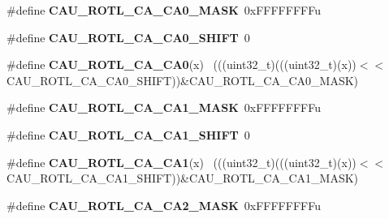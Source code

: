 \begin{DoxyCompactItemize}
\item 
\hypertarget{group___c_a_u___register___masks_ga2b86bab9480c6bf6115dad260ab161a3}{}\#define {\bfseries C\+A\+U\+\_\+\+R\+O\+T\+L\+\_\+\+C\+A\+\_\+\+C\+A0\+\_\+\+M\+A\+S\+K}~0x\+F\+F\+F\+F\+F\+F\+F\+Fu\label{group___c_a_u___register___masks_ga2b86bab9480c6bf6115dad260ab161a3}

\item 
\hypertarget{group___c_a_u___register___masks_ga3181be32a342d2194fc201a642c18878}{}\#define {\bfseries C\+A\+U\+\_\+\+R\+O\+T\+L\+\_\+\+C\+A\+\_\+\+C\+A0\+\_\+\+S\+H\+I\+F\+T}~0\label{group___c_a_u___register___masks_ga3181be32a342d2194fc201a642c18878}

\item 
\hypertarget{group___c_a_u___register___masks_ga767139321c3d6a1db9f2c135908d4c5a}{}\#define {\bfseries C\+A\+U\+\_\+\+R\+O\+T\+L\+\_\+\+C\+A\+\_\+\+C\+A0}(x)                                          ~(((uint32\+\_\+t)(((uint32\+\_\+t)(x))$<$$<$C\+A\+U\+\_\+\+R\+O\+T\+L\+\_\+\+C\+A\+\_\+\+C\+A0\+\_\+\+S\+H\+I\+F\+T))\&C\+A\+U\+\_\+\+R\+O\+T\+L\+\_\+\+C\+A\+\_\+\+C\+A0\+\_\+\+M\+A\+S\+K)\label{group___c_a_u___register___masks_ga767139321c3d6a1db9f2c135908d4c5a}

\item 
\hypertarget{group___c_a_u___register___masks_gabfb4747ca51ec2bf523adf1d27b3a55c}{}\#define {\bfseries C\+A\+U\+\_\+\+R\+O\+T\+L\+\_\+\+C\+A\+\_\+\+C\+A1\+\_\+\+M\+A\+S\+K}~0x\+F\+F\+F\+F\+F\+F\+F\+Fu\label{group___c_a_u___register___masks_gabfb4747ca51ec2bf523adf1d27b3a55c}

\item 
\hypertarget{group___c_a_u___register___masks_ga7a9ebabc5cddc8cb1d94f2b371b614d2}{}\#define {\bfseries C\+A\+U\+\_\+\+R\+O\+T\+L\+\_\+\+C\+A\+\_\+\+C\+A1\+\_\+\+S\+H\+I\+F\+T}~0\label{group___c_a_u___register___masks_ga7a9ebabc5cddc8cb1d94f2b371b614d2}

\item 
\hypertarget{group___c_a_u___register___masks_ga129821ccbdd5b4576029a7b9c0bfeccd}{}\#define {\bfseries C\+A\+U\+\_\+\+R\+O\+T\+L\+\_\+\+C\+A\+\_\+\+C\+A1}(x)                                          ~(((uint32\+\_\+t)(((uint32\+\_\+t)(x))$<$$<$C\+A\+U\+\_\+\+R\+O\+T\+L\+\_\+\+C\+A\+\_\+\+C\+A1\+\_\+\+S\+H\+I\+F\+T))\&C\+A\+U\+\_\+\+R\+O\+T\+L\+\_\+\+C\+A\+\_\+\+C\+A1\+\_\+\+M\+A\+S\+K)\label{group___c_a_u___register___masks_ga129821ccbdd5b4576029a7b9c0bfeccd}

\item 
\hypertarget{group___c_a_u___register___masks_ga747bae472035b772b9099ece284b7520}{}\#define {\bfseries C\+A\+U\+\_\+\+R\+O\+T\+L\+\_\+\+C\+A\+\_\+\+C\+A2\+\_\+\+M\+A\+S\+K}~0x\+F\+F\+F\+F\+F\+F\+F\+Fu\label{group___c_a_u___register___masks_ga747bae472035b772b9099ece284b7520}


\end{DoxyCompactItemize}
